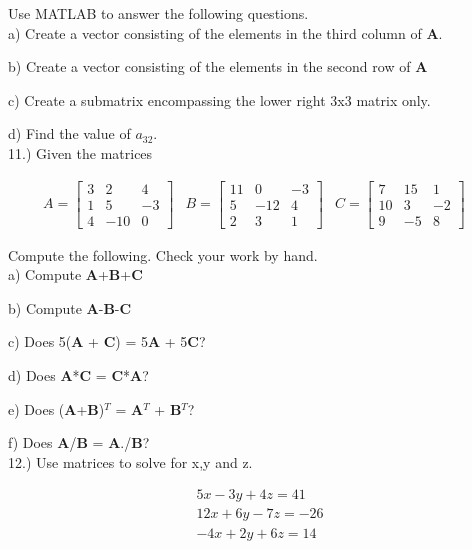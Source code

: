 Use MATLAB to answer the following
questions. 
\ \\

a) Create a vector consisting of the elements in the third column of
{\bf A}.

b) Create a vector consisting of the elements in the second row of
{\bf A}

c) Create a submatrix encompassing the lower right 3x3 matrix only.

d) Find the value of $a_{32}$.
\ \\

11.) Given the matrices

\begin{equation} \nonumber
\begin{matrix}
A = \begin{bmatrix} 3 & 2 & 4 \\ 1 & 5 & -3 \\ 4 & -10 & 0\end{bmatrix} &
B = \begin{bmatrix} 11 & 0 & -3 \\ 5 & -12 & 4 \\ 2 & 3 & 1\end{bmatrix} &
C = \begin{bmatrix} 7 & 15 & 1 \\ 10 & 3 & -2 \\ 9 & -5 & 8\end{bmatrix} &
\end{matrix}
\end{equation}

Compute the following. Check your work by hand.
\ \\

a) Compute {\bf A}+{\bf B}+{\bf C}

b) Compute {\bf A}-{\bf B}-{\bf C}

c) Does 5({\bf A} + {\bf C}) = 5{\bf A} + 5{\bf C}?

d) Does {\bf A}*{\bf C} = {\bf C}*{\bf A}?

e) Does ({\bf A}+{\bf B})$^T$ = {\bf A}$^T$ + {\bf B}$^T$?

f) Does {\bf A}/{\bf B} = {\bf A}./{\bf B}?
\ \\

12.) Use matrices to solve for x,y and z.

\begin{equation} \nonumber
\begin{matrix}
5x-3y+4z = 41 \\
12x + 6y -7z = -26 \\
-4x + 2y + 6z = 14 
\end{matrix}
\end{equation}
\ \\

